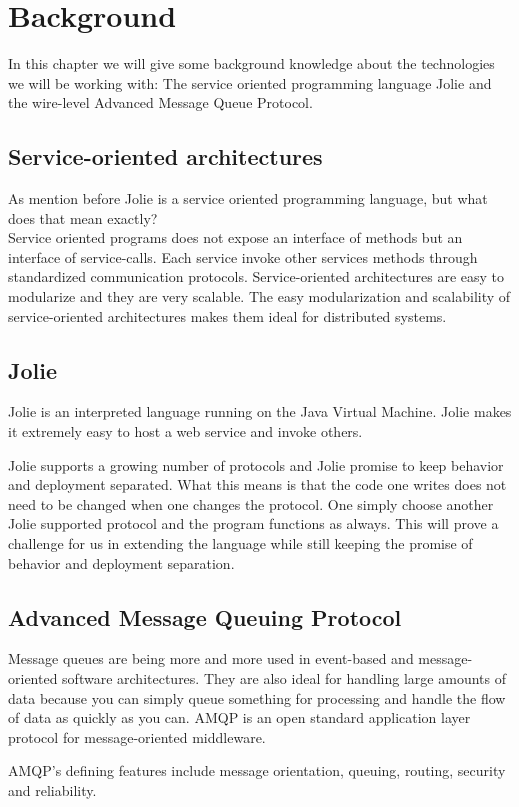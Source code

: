 \section{Background}
In this chapter we will give some background knowledge about the technologies we will be working with: The service oriented programming language Jolie and the wire-level Advanced Message Queue Protocol.
\subsection{Service-oriented architectures}
As mention before Jolie is a service oriented programming language, but what does that mean exactly?\\
Service oriented programs does not expose an interface of methods but an interface of service-calls. Each service invoke other services methods through standardized communication protocols. Service-oriented architectures are easy to modularize and they are very scalable. The easy modularization and scalability of service-oriented architectures makes them ideal for distributed systems.
\subsection{Jolie}
Jolie\cite[Jolie-lang.org]{Jolie} is an interpreted language running on the Java Virtual Machine. Jolie makes it extremely easy to host a web service and invoke others.

Jolie supports a growing number of protocols and Jolie promise to keep behavior and deployment separated. What this means is that the code one writes does not need to be changed when one changes the protocol. One simply choose another Jolie supported protocol and the program functions as always. This will prove a challenge for us in extending the language while still keeping the promise of behavior and deployment separation.
\subsection{Advanced Message Queuing Protocol}
Message queues are being more and more used in event-based and message-oriented software architectures. They are also ideal for handling large amounts of data because you can simply queue something for processing and handle the flow of data as quickly as you can. AMQP\cite{AMQP} is an open standard application layer protocol for message-oriented middleware.

AMQP's defining features include message orientation, queuing, routing, security and reliability.
